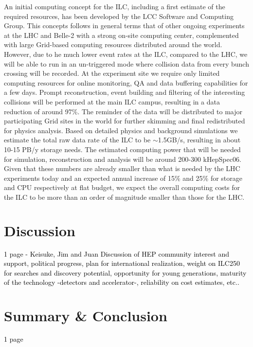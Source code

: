 \documentclass[%
 reprint,
 amsmath,amssymb,
 aps,
]{revtex4-1}
\newcommand{\todo}[1]{\textcolor{black}{{#1}}}
\begin{document}
  
An initial computing concept for the ILC, including a first estimate of the required resources, has been developed by the LCC Software and Computing Group.
This concepts follows in general terms that of other ongoing experiments at the LHC and Belle-2 with a strong on-site computing center, complemented with large
Grid-based computing resources distributed around the world. However, due to he much lower event rates at the ILC, compared to the LHC, we will be
able to run in an un-triggered mode where collision data from every bunch crossing will be recorded. At the experiment site we require only limited computing
resources for online monitoring, QA and data buffering capabilities for a few days. Prompt reconstruction, event building and filtering of the interesting collisions
will be performed at the main ILC campus, resulting in a data reduction of around 97\%. The reminder of the data will be distributed to major participating Grid sites
in the world for further skimming and final redistributed for physics analysis.
Based on detailed physics and background simulations we estimate the total raw data rate of the ILC to be $\sim$1.5GB/s, resulting in about 10-15 PB/y storage needs.
The estimated computing power that will be needed for simulation, reconstruction and analysis will be around 200-300 kHepSpec06.
Given that these numbers are already smaller than what is needed by the LHC experiments today and an expected annual increase of 15\% and 25\% for storage and CPU
respectively at flat budget, we expect the overall computing costs for the ILC to be more than an order of magnitude smaller than those for the LHC.

\section{\label{sec:discuss}Discussion}

\todo{ 1 page - Keisuke, Jim and Juan
Discussion of HEP community interest and support, political progress, plan for international realization, weight on ILC250 for searches and discovery potential, opportunity for young generations, maturity of the technology -detectors and accelerator-, reliability on cost estimates, etc..}

\section{\label{sec:sum}Summary \& Conclusion} 

\todo{ 1 page }

%

\end{document}
